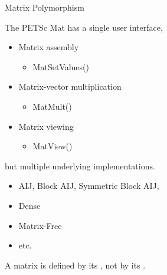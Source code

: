 \begin{frame}{Matrix Polymorphism}

The PETSc {\kb Mat} has a single user interface,
\begin{itemize}
  \item Matrix assembly
  \begin{itemize}
    \item {\kb MatSetValues()}
  \end{itemize}

  \item Matrix-vector multiplication
  \begin{itemize}
    \item {\kb MatMult()}
  \end{itemize}

  \item Matrix viewing
  \begin{itemize}
    \item {\kb MatView()}
  \end{itemize}
\end{itemize}
but multiple underlying implementations.
\begin{itemize}
  \item AIJ, Block AIJ, Symmetric Block AIJ,
  \item Dense
  \item Matrix-Free
  \item etc.
\end{itemize}
A matrix is defined by its {}, not by its {}.

\end{frame}

